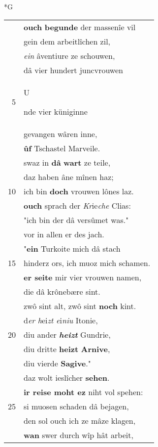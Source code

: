 \documentclass[8pt,a4paper,notitlepage]{article}
\begin{document}
\newpage
\begin{table}[ht]
\begin{minipage}[t]{0.5\linewidth}
\small
\begin{center}*G
\end{center}
\begin{tabular}{rl}
 & \textbf{ouch} \textbf{begunde} der massenîe vil\\ 
 & gein dem arbeitlîchen zil,\\ 
 & \textit{ein} âventiure ze schouwen,\\ 
 & dâ vier hundert juncvrouwen\\ 
5 & \begin{large}U\end{large}nde vier küniginne\\ 
 & gevangen wâren inne,\\ 
 & \textbf{ûf} Tschastel Marveile.\\ 
 & swaz in \textbf{dâ} \textbf{wart} ze teile,\\ 
 & daz haben âne mînen haz;\\ 
10 & ich bin \textbf{doch} vrouwen lônes laz.\\ 
 & \textbf{ouch} sprach der \textit{Kr}ie\textit{che} Clias:\\ 
 & "ich bin der dâ versûmet was."\\ 
 & vor in allen er des jach.\\ 
 & "\textbf{ein} Turkoite mich dâ stach\\ 
15 & hinderz ors, ich muoz mich schamen.\\ 
 & \textbf{er seite} mir vier vrouwen namen,\\ 
 & die dâ krônebære sint.\\ 
 & zwô sint alt, zwô sint \textbf{noch} kint.\\ 
 & d\textit{er h}ei\textit{zt e}i\textit{niu} Itonie,\\ 
20 & diu ander \textit{\textbf{heizt}} Gundrie,\\ 
 & diu dritte \textbf{heizt} \textbf{Arnive},\\ 
 & diu vierde \textbf{Sagive}."\\ 
 & daz wolt ieslîcher \textbf{sehen}.\\ 
 & \textbf{ir reise moht ez} niht vol spehen:\\ 
25 & si muosen schaden dâ bejagen,\\ 
 & den sol ouch ich ze mâze klagen,\\ 
 & \textbf{wan} swer durch wîp hât arbeit,\\ 

\end{tabular}
\end{minipage}
\end{table}
\end{document}
